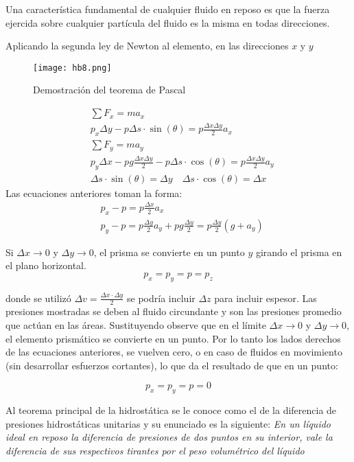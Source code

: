 Una característica fundamental de cualquier fluido en reposo es que la fuerza ejercida sobre cualquier partícula del fluido es la misma en todas direcciones.

Aplicando la segunda ley de Newton al elemento, en las direcciones $x$ y $y$

\begin{figure}[h!]
  \centerline{\texttt{[image: hb8.png]}}
  \caption{Demostración del teorema de Pascal}
  \label{hb8}
\end{figure}
\begin{align*}
    &\sum F_x=ma_x\\
    &p_x\Delta y-p\Delta s\cdot \sin{(\theta)}=p\frac{\Delta x\Delta y}{2}a_x\\
    &\sum F_y=ma_y\\
    &p_y\Delta x-pg\frac{\Delta x \Delta y}{2}-p\Delta s\cdot \cos{(\theta)}=p\frac{\Delta x\Delta y}{2}a_y\\
    &\Delta s\cdot \sin{(\theta)}=\Delta y\quad \Delta s\cdot \cos{(\theta)}=\Delta x
\end{align*}
Las ecuaciones anteriores toman la forma:
\begin{align*}
    &p_x-p=p\frac{\Delta x}{2}a_x\\
    &p_y-p=p\frac{\Delta y}{2}a_y+pg\frac{\Delta y}{2}=p\frac{\Delta y}{2}(g+a_y)
\end{align*}

Si $\Delta x\to 0$ y $\Delta y\to 0$, el prisma se convierte en un punto $y$ girando el prisma en el plano horizontal.
\begin{equation}
    p_x=p_y=p=p_z
\end{equation}

donde se utilizó $\Delta v=\frac{\Delta x\cdot \Delta y}{2}$ se podría incluir $\Delta z$ para incluir espesor. Las presiones mostradas se deben al fluido circundante y son las presiones promedio que actúan en las áreas. Sustituyendo observe que en el límite $\Delta x\to 0$
y $\Delta y\to 0$, el elemento prismático se convierte en un punto. Por lo tanto los lados derechos de las ecuaciones anteriores, se vuelven cero, o en caso de fluidos en movimiento (sin desarrollar esfuerzos cortantes), lo que da el resultado de que en un punto: 

\begin{equation}
    p_x=p_y=p=0
\end{equation}


\begin{theorem}
    Al teorema principal de la hidrostática se le conoce como  el de la diferencia de presiones hidrostáticas unitarias y su enunciado es la siguiente: \emph{En un líquido ideal en reposo la diferencia de presiones de dos puntos en su interior, vale la diferencia de sus respectivos tirantes por el peso volumétrico del líquido}
\end{theorem}

